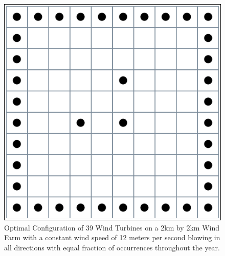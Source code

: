     \begin{figure}[H]
        \centering
        \includegraphics[width=15cm]{Figures/optimalA.png}
        \caption{Optimal Configuration of 39 Wind Turbines on a 2km by 2km Wind Farm with a constant wind speed of 12 meters per second blowing in all directions with equal fraction of occurrences throughout the year.}
        \label{optimalA}
    \end{figure}
    
    
    
